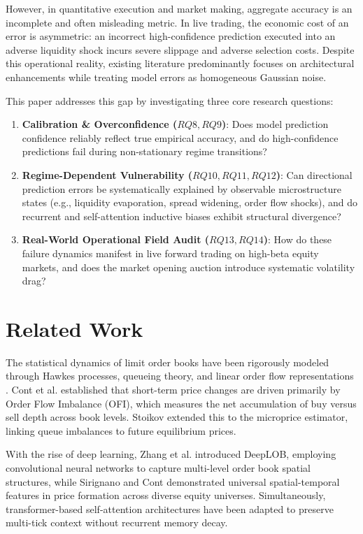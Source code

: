 \documentclass[10pt,twocolumn,letterpaper]{article}
\begin{document}
However, in quantitative execution and market making, aggregate accuracy is an incomplete and often misleading metric. In live trading, the economic cost of an error is asymmetric: an incorrect high-confidence prediction executed into an adverse liquidity shock incurs severe slippage and adverse selection costs. Despite this operational reality, existing literature predominantly focuses on architectural enhancements while treating model errors as homogeneous Gaussian noise.

This paper addresses this gap by investigating three core research questions:
\begin{enumerate}
    \item \textbf{Calibration \& Overconfidence ($RQ8, RQ9$)}: Does model prediction confidence reliably reflect true empirical accuracy, and do high-confidence predictions fail during non-stationary regime transitions?
    \item \textbf{Regime-Dependent Vulnerability ($RQ10, RQ11, RQ12$)}: Can directional prediction errors be systematically explained by observable microstructure states (e.g., liquidity evaporation, spread widening, order flow shocks), and do recurrent and self-attention inductive biases exhibit structural divergence?
    \item \textbf{Real-World Operational Field Audit ($RQ13, RQ14$)}: How do these failure dynamics manifest in live forward trading on high-beta equity markets, and does the market opening auction introduce systematic volatility drag?
\end{enumerate}

\section{Related Work}
The statistical dynamics of limit order books have been rigorously modeled through Hawkes processes, queueing theory, and linear order flow representations \cite{bouchaud2002statistical, cont2014price, cartea2015algorithmic}. Cont et al. \cite{cont2014price} established that short-term price changes are driven primarily by Order Flow Imbalance (OFI), which measures the net accumulation of buy versus sell depth across book levels. Stoikov \cite{stoikov2018micro} extended this to the microprice estimator, linking queue imbalances to future equilibrium prices.

With the rise of deep learning, Zhang et al. \cite{zhang2019deeplob} introduced DeepLOB, employing convolutional neural networks to capture multi-level order book spatial structures, while Sirignano and Cont \cite{sirignano2019universal} demonstrated universal spatial-temporal features in price formation across diverse equity universes. Simultaneously, transformer-based self-attention architectures \cite{vaswani2017attention} have been adapted to preserve multi-tick context without recurrent memory decay.
\end{document}
